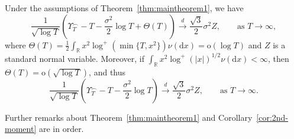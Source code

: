 \documentclass[10pt]{amsart}
\theoremstyle{definition}\newtheorem{defi}[theo]{Definition}\newtheorem{rema}[theo]{Remark}\newtheorem{exam}[theo]{Example}\newtheorem{exem}[theo]{Example}\newtheorem{nota}[theo]{Notation}
\newcommand\R{\mathbb{R}}
\newcommand\1{\mathds{1}}
\newcommand\D{\mathrm{d}}
\newcommand\oh{\mathrm{o}}
\newcommand\cid{\xrightarrow{d}}
\begin{document}
\begin{coro}\label{cor:2nd-moment}
Under the assumptions of Theorem~\ref{thm:maintheorem1}, we have
\begin{equation}\label{eq:CLT-2}
\frac{1}{\sqrt{\log T}}
\left(\Upsilon_T^{\frown} -T-\frac{\sigma^2}{2}\log T +\Theta(T)\right)
\cid \frac{\sqrt{3}}{2}\sigma^2 Z,
\qquad\text{as }T\to\infty,
\end{equation}
where $\Theta(T)=\tfrac{1}{2}\int_\R x^2\log^+(\min\{T,x^2\})\nu(\D x)=\oh(\log T)$ and $Z$ is a standard normal variable. Moreover, if $\int_\R x^2\log^+(|x|)^{1/2}\nu(\D x)<\infty$, then $\Theta(T)=\oh(\sqrt{\log T})$, and thus
\begin{equation}\label{eq:CLT-3}
\frac{1}{\sqrt{\log T}}
\left(\Upsilon_T^{\frown} -T-\frac{\sigma^2}{2}\log T\right)
\cid \frac{\sqrt{3}}{2}\sigma^2 Z,
\qquad\text{as }T\to\infty.
\end{equation}
\end{coro}

Further remarks about Theorem~\ref{thm:maintheorem1} and Corollary~\ref{cor:2nd-moment} are in order.
\end{document}
